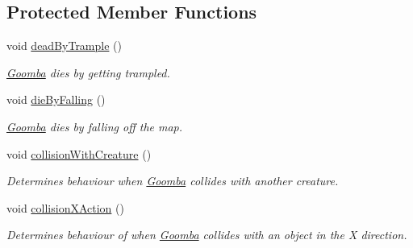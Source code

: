 \subsection*{Protected Member Functions}
\begin{DoxyCompactItemize}
\item 
\mbox{\label{classnl_1_1arjanfrans_1_1mario_1_1model_1_1Goomba_a76e5dd07d57bf351793acd2de5a5f901}} 
void \hyperlink{classnl_1_1arjanfrans_1_1mario_1_1model_1_1Goomba_a76e5dd07d57bf351793acd2de5a5f901}{dead\+By\+Trample} ()
\begin{DoxyCompactList}\small\item\em \hyperlink{classnl_1_1arjanfrans_1_1mario_1_1model_1_1Goomba}{Goomba} dies by getting trampled. \end{DoxyCompactList}\item 
\mbox{\label{classnl_1_1arjanfrans_1_1mario_1_1model_1_1Goomba_a494785b906ae8fcaf9057ecbc12ee55d}} 
void \hyperlink{classnl_1_1arjanfrans_1_1mario_1_1model_1_1Goomba_a494785b906ae8fcaf9057ecbc12ee55d}{die\+By\+Falling} ()
\begin{DoxyCompactList}\small\item\em \hyperlink{classnl_1_1arjanfrans_1_1mario_1_1model_1_1Goomba}{Goomba} dies by falling off the map. \end{DoxyCompactList}\item 
void \hyperlink{classnl_1_1arjanfrans_1_1mario_1_1model_1_1Goomba_a4582ee22090958c89e08267a2393c46c}{collision\+With\+Creature} ()
\begin{DoxyCompactList}\small\item\em Determines behaviour when \hyperlink{classnl_1_1arjanfrans_1_1mario_1_1model_1_1Goomba}{Goomba} collides with another creature. \end{DoxyCompactList}\item 
\mbox{\label{classnl_1_1arjanfrans_1_1mario_1_1model_1_1Goomba_a47885ec93ca549c62176a931a46de7e6}} 
void \hyperlink{classnl_1_1arjanfrans_1_1mario_1_1model_1_1Goomba_a47885ec93ca549c62176a931a46de7e6}{collision\+X\+Action} ()
\begin{DoxyCompactList}\small\item\em Determines behaviour of when \hyperlink{classnl_1_1arjanfrans_1_1mario_1_1model_1_1Goomba}{Goomba} collides with an object in the X direction. \end{DoxyCompactList}\end{DoxyCompactItemize}
